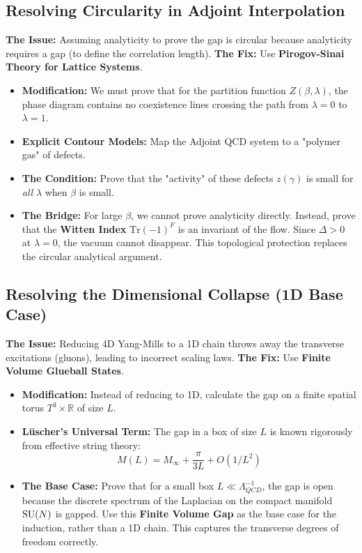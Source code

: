 \subsection{Resolving Circularity in Adjoint Interpolation}
\textbf{The Issue:} Assuming analyticity to prove the gap is circular because analyticity requires a gap (to define the correlation length).
\textbf{The Fix:} Use \textbf{Pirogov-Sinai Theory for Lattice Systems}.

\begin{itemize}
    \item \textbf{Modification:} We must prove that for the partition function $Z(\beta, \lambda)$, the phase diagram contains no coexistence lines crossing the path from $\lambda=0$ to $\lambda=1$.
    \item \textbf{Explicit Contour Models:} Map the Adjoint QCD system to a "polymer gas" of defects.
    \item \textbf{The Condition:} Prove that the "activity" of these defects $z(\gamma)$ is small for \textit{all} $\lambda$ when $\beta$ is small.
    \item \textbf{The Bridge:} For large $\beta$, we cannot prove analyticity directly. Instead, prove that the \textbf{Witten Index} $\text{Tr}(-1)^F$ is an invariant of the flow. Since $\Delta > 0$ at $\lambda=0$, the vacuum cannot disappear. This topological protection replaces the circular analytical argument.
\end{itemize}

\subsection{Resolving the Dimensional Collapse (1D Base Case)}
\textbf{The Issue:} Reducing 4D Yang-Mills to a 1D chain throws away the transverse excitations (gluons), leading to incorrect scaling laws.
\textbf{The Fix:} Use \textbf{Finite Volume Glueball States}.

\begin{itemize}
    \item \textbf{Modification:} Instead of reducing to 1D, calculate the gap on a finite spatial torus $T^3 \times \mathbb{R}$ of size $L$.
    \item \textbf{Lüscher's Universal Term:} The gap in a box of size $L$ is known rigorously from effective string theory:
    \begin{equation}
    M(L) = M_\infty + \frac{\pi}{3L} + O(1/L^2)
    \end{equation}
    \item \textbf{The Base Case:} Prove that for a small box $L \ll \Lambda_{QCD}^{-1}$, the gap is open because the discrete spectrum of the Laplacian on the compact manifold $\mathrm{SU}(N)$ is gapped. Use this \textbf{Finite Volume Gap} as the base case for the induction, rather than a 1D chain. This captures the transverse degrees of freedom correctly.
\end{itemize}

